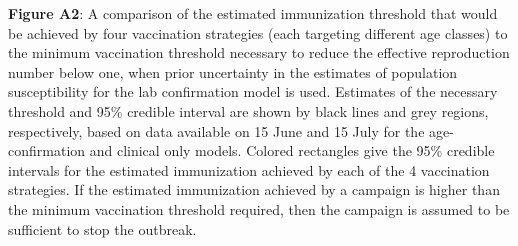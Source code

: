 \textbf{Figure A2}: A comparison of the estimated immunization threshold that would be achieved by four vaccination strategies (each targeting different age classes) to the minimum vaccination threshold necessary to reduce the effective reproduction number below one, when prior uncertainty in the estimates of population susceptibility for the lab confirmation model is used. Estimates of the necessary threshold and 95\% credible interval are shown by black lines and grey regions, respectively, based on data available on 15 June and 15 July for the age-confirmation and clinical only models.  Colored rectangles give the 95\% credible intervals for the estimated immunization achieved by each of the 4 vaccination strategies. If the estimated immunization achieved by a campaign is higher than the minimum vaccination threshold required, then the campaign is assumed to be sufficient to stop the outbreak.